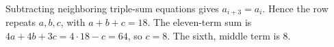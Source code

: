 Subtracting neighboring triple-sum equations gives $a_{i+3}=a_i$. Hence the row repeats $a,b,c$, with $a+b+c=18$. The eleven-term sum is $4a+4b+3c=4\cdot18-c=64$, so $c=8$. The sixth, middle term is $\boxed8$.
